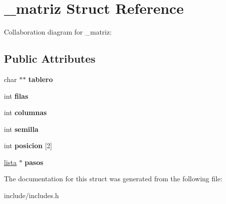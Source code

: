 \hypertarget{struct__matriz}{}\section{\+\_\+matriz Struct Reference}
\label{struct__matriz}


Collaboration diagram for \+\_\+matriz\+:
\subsection*{Public Attributes}
\begin{DoxyCompactItemize}
\item 
\mbox{\label{struct__matriz_a4340014e107f37b3c6d5c1cbc786e533}} 
char $\ast$$\ast$ {\bfseries tablero}
\item 
\mbox{\label{struct__matriz_a99af3367c6a107f86605ef5181a14214}} 
int {\bfseries filas}
\item 
\mbox{\label{struct__matriz_a60dd69fa69ed2472df36d8871d226d29}} 
int {\bfseries columnas}
\item 
\mbox{\label{struct__matriz_aad60e69375e8b5ffd0efcd4a5b3087f3}} 
int {\bfseries semilla}
\item 
\mbox{\label{struct__matriz_a43d5f7520a20d05b23a3e9981b27d792}} 
int {\bfseries posicion} \mbox{[}2\mbox{]}
\item 
\mbox{\label{struct__matriz_a9945e461bfb914b05b2ef80b41ed7bd7}} 
\hyperlink{struct__lista}{lista} $\ast$ {\bfseries pasos}
\end{DoxyCompactItemize}


The documentation for this struct was generated from the following file\+:\begin{DoxyCompactItemize}
\item 
include/includes.\+h\end{DoxyCompactItemize}
